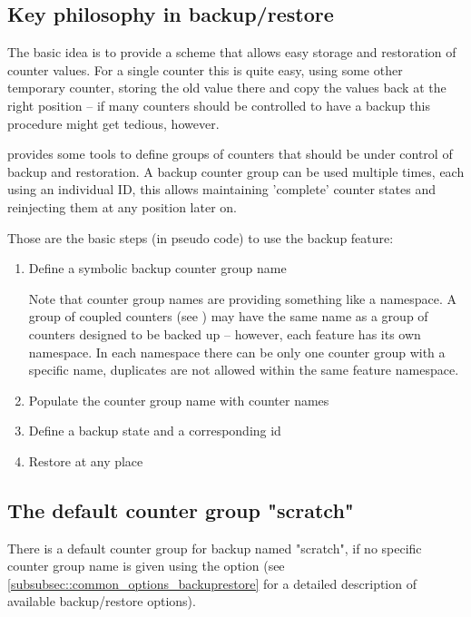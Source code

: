 \documentclass[12pt,a4paper,oneside]{article}
\begin{document}
\subsection{Key philosophy in backup/restore}

The basic idea is to provide a scheme that allows easy storage and restoration of counter values. For a single counter this is quite easy, using some other temporary counter, storing the old value there and copy the values back at the right position -- if many counters should be controlled to have a backup this procedure might get tedious, however. 

 provides some tools to define groups of counters that should be under control of backup and restoration. A backup counter group can be used multiple times, each using an individual ID, this allows maintaining 'complete' counter states and reinjecting them at any position later on.

Those are the basic steps (in pseudo code) to use the backup feature:

\begin{enumerate}
  \item Define a symbolic backup counter group name 

    Note that counter group names are providing something like a namespace. A group of coupled counters (see  ) may have the same name as a group of counters designed to be backed up -- however, each feature has its own namespace. In each namespace there can be only one counter group with a specific name, duplicates are not allowed within the same feature namespace.
  \item Populate the counter group name with counter names
  \item Define a backup state and a corresponding id 
  \item Restore at any place
\end{enumerate}

\subsection{The default counter group "scratch"}

There is a default counter group for backup named "scratch", if no specific counter group name is given using the  option (see \cref{subsubsec::common_options_backuprestore} for a detailed description of available backup/restore options). 
\end{document}
